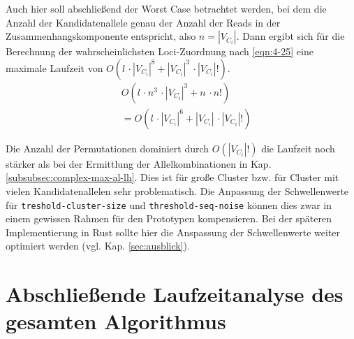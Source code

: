 Auch hier soll abschließend der Worst Case betrachtet werden, bei dem die Anzahl der Kandidatenallele genau der Anzahl der Reads in der Zusammenhangskomponente entspricht, also $ n = |V_{C_{i}}| $. Dann ergibt sich für die Berechnung der wahrscheinlichsten Loci-Zuordnung nach \eqref{eqn:4-25} eine maximale Laufzeit von $ O( l \, \cdotp |V_{C_{i}}|^8 + |V_{C_{i}}|^3  \, \cdotp |V_{C_{i}}|!) $.
\begin{equation} \label{eqn:4-25}
\tag{4-25}
\begin{aligned}
&\ {} O( l\, \cdotp n^3  \, \cdotp |V_{C_{i}}|^3 + n  \, \cdotp n!)\\
&\ = O( l \, \cdotp |V_{C_{i}}|^6 + |V_{C_{i}}| \, \cdotp |V_{C_{i}}|!)
\end{aligned}
\end{equation}

Die Anzahl der Permutationen dominiert durch $ O(|V_{C_{i}}|!) $ die Laufzeit noch stärker als bei der Ermittlung der Allelkombinationen in Kap. \ref{subsubsec:complex-max-al-lh}. Dies ist für große Cluster bzw. für Cluster mit vielen Kandidatenallelen sehr problematisch. Die Anpassung der Schwellenwerte für \lstinline|treshold-cluster-size| und  \lstinline|threshold-seq-noise| können dies zwar in einem gewissen Rahmen für den Prototypen kompensieren. Bei der späteren Implementierung in Rust sollte hier die Anspassung der Schwellenwerte weiter optimiert werden (vgl. Kap. \ref{sec:ausblick}).

\section[Gesamtlaufzeit des Algorithmus]{Abschließende Laufzeitanalyse des gesamten Algorithmus}

